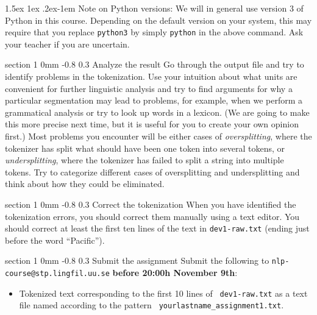 \documentclass[11pt]{article}
\makeatletter
\newcommand{\newsec}[2]{\section{#1}\label{sec:#2}\noindent}
\renewcommand{\section}{\@startsection
{section}%
{1}%
{0mm}%
{-0.8\baselineskip}%
{0.3\baselineskip}%
{\bfseries\large}}%
\renewcommand{\paragraph}{%
  \@startsection{paragraph}{4}%
  {\z@}{1.5ex \@plus 1ex \@minus .2ex}{-1em}%
  {\normalfont\normalsize\bfseries}%
}\makeatother
\makeatother
\begin{document}
\paragraph{Note on Python versions:} 
We will in general use version 3 of Python in this course. Depending
on the default version on your system, this may require that you
replace {\tt python3} by simply {\tt python} in the above command.
Ask your teacher if you are uncertain.

\newsec{Analyze the result}{analyse}%
Go through the output file and try to identify problems in the
tokenization. Use your intuition about what units are convenient for
further linguistic analysis and try to find arguments for why a
particular segmentation may lead to problems, for example, when we
perform a grammatical analysis or try to look up words in a
lexicon. (We are going to make this more precise next time, but it is
useful for you to create your own opinion first.)  Most problems you
encounter will be either cases of \emph{oversplitting}, where the
tokenizer has split what should have been one token into several
tokens, or \emph{undersplitting}, where the tokenizer has failed to
split a string into multiple tokens. Try to categorize different cases
of oversplitting and undersplitting and think about how they could be
eliminated.

\newsec{Correct the tokenization}{correct}%
When you have identified the tokenization errors, you should correct
them manually using a text editor. You should correct at least the
first ten lines of the text in {\tt dev1-raw.txt} (ending just before
the word ``Pacific'').

\newsec{Submit the assignment}{submit}%
Submit the following to {\tt nlp-course@stp.lingfil.uu.se} {\bf before 20:00h November 9th}: 
\begin{itemize}[noitemsep,topsep=0.2cm]
\item Tokenized text corresponding to the first 10 lines of {\tt
    dev1-raw.txt} as a text file named according to the pattern {\tt
    yourlastname\_assignment1.txt}. %
\end{itemize}

\end{document}

